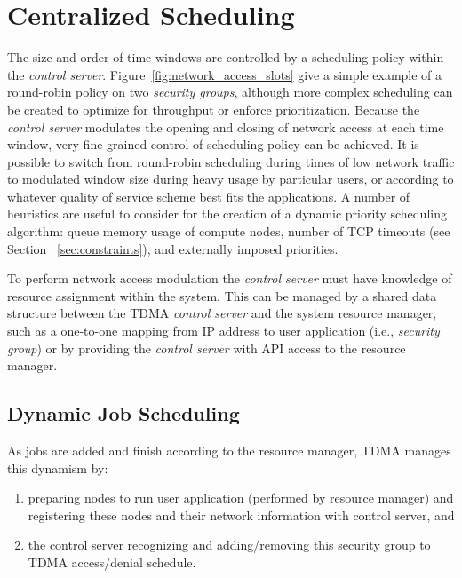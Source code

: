 \documentclass[oneside,12pt]{memoir}
\begin{document}
\section{Centralized Scheduling}
The size and order of time windows are controlled by a scheduling policy within the \textit{control server}. Figure~\ref{fig:network_access_slots} give a simple example of a round-robin policy on two \textit{security groups}, although more complex scheduling can be created to optimize for throughput or enforce prioritization. Because the \textit{control server} modulates the opening and closing of network access at each time window, very fine grained control of scheduling policy can be achieved. It is possible to switch from round-robin scheduling during times of low network traffic to modulated window size during heavy usage by particular users, or according to whatever quality of service scheme best fits the applications. A number of heuristics are useful to consider for the creation of a dynamic priority scheduling algorithm: queue memory usage of compute nodes, number of TCP timeouts (see Section ~\ref{sec:constraints}), and externally imposed priorities. 

To perform network access modulation the \textit{control server} must have knowledge of resource assignment within the system. This can be managed by a shared data structure between the TDMA \textit{control server} and the system resource manager, such as a one-to-one mapping from IP address to user application (i.e., \textit{security group}) or by providing the \textit{control server} with API access to the resource manager.

\subsection{Dynamic Job Scheduling}
As jobs are added and finish according to the resource manager, TDMA manages this dynamism by:
\begin{enumerate}
\item preparing nodes to run user application (performed by resource manager) and registering these nodes and their network information with control server, and
\item the control server recognizing and adding/removing this security group to TDMA access/denial schedule.
\end{enumerate}
\end{document}
